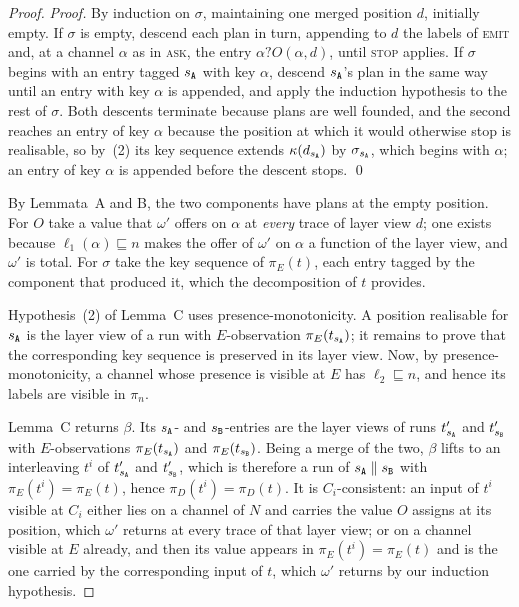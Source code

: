 \documentclass[preprint,5p,twocolumn]{elsarticle}
\begin{document}
\begin{proof}
  \emph{Proof.} By induction on $\sigma$, maintaining one merged position $d$, initially empty. If
  $\sigma$ is empty, descend each plan in turn, appending to $d$ the labels of \textsc{emit} and,
  at a channel $\alpha$ as in \textsc{ask}, the entry $\alpha ? O(\alpha, d)$, until \textsc{stop}
  applies. If
  $\sigma$ begins with an entry tagged $s_{\mathtt{A}}$ with key $\alpha$, descend $s_{\mathtt{A}}$'s plan in the same way
  until an entry with key $\alpha$ is appended, and apply the induction hypothesis to the rest of
  $\sigma$. Both descents terminate because plans are well founded, and the second reaches an entry
  of key $\alpha$ because the position at which it would otherwise stop is realisable, so by~(2) its
  key sequence extends $\kappa(d_{s_{\mathtt{A}}})$ by $\sigma_{s_{\mathtt{A}}}$, which begins with $\alpha$; an entry of
  key $\alpha$ is appended before the descent stops. \qed

  By Lemmata~A and B, the two components have plans at the empty position. For $O$ take a
  value that $\omega'$ offers on $\alpha$ at \emph{every} trace of layer view $d$; one exists
  because $\ell_1(\alpha) \sqsubseteq n$ makes the offer of $\omega'$ on $\alpha$ a function of the
  layer view, and $\omega'$ is total. For $\sigma$ take the key sequence of $\pi_E(t)$, each entry
  tagged by the component that produced it, which the decomposition of $t$ provides.

  Hypothesis~(2) of Lemma~C uses presence-monotonicity. A position
  realisable for $s_{\mathtt{A}}$ is the layer view of a run with $E$-observation $\pi_E(t_{s_{\mathtt{A}}})$;
  it remains to prove that the corresponding key sequence is preserved
  in its layer view.
  Now, by presence-monotonicity, a channel whose presence is visible at $E$ has
  $\ell_2 \sqsubseteq n$, and hence its labels are visible in $\pi_n$.

  Lemma~C returns $\beta$. Its $s_{\mathtt{A}}$- and $s_{\mathtt{B}}$-entries are the layer views of runs
  $t'_{s_{\mathtt{A}}}$ and $t'_{s_{\mathtt{B}}}$ with $E$-observations $\pi_E(t_{s_{\mathtt{A}}})$ and $\pi_E(t_{s_{\mathtt{B}}})$.
  Being a merge of the two, $\beta$ lifts to an interleaving $t^i$ of $t'_{s_{\mathtt{A}}}$ and $t'_{s_{\mathtt{B}}}$,
  which is therefore a run of $s_{\mathtt{A}} \parallel s_{\mathtt{B}}$ with $\pi_E(t^i) = \pi_E(t)$, hence
  $\pi_D(t^i) = \pi_D(t)$. It is $C_i$-consistent: an input of $t^i$ visible at $C_i$ either lies on
  a channel of $N$ and carries the value $O$ assigns at its position, which $\omega'$ returns at
  every trace of that layer view; or on a channel visible at $E$ already, and then
  its value appears in $\pi_E(t^i) = \pi_E(t)$ and is the one carried by the corresponding input of
  $t$, which $\omega'$ returns by our induction hypothesis.
\end{proof}
\end{document}
